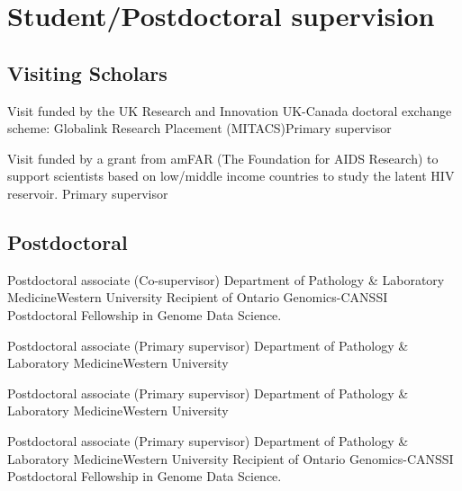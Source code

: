 
\section {Student/Postdoctoral supervision}

\subsection {Visiting Scholars}

{Visit funded by the UK Research and Innovation UK-Canada doctoral exchange scheme: Globalink Research Placement (MITACS)}{}{Primary supervisor}

{Visit funded by a grant from amFAR (The Foundation for AIDS Research) to support scientists based on low/middle income countries to study the latent HIV reservoir.}
{}{Primary supervisor}



\subsection {Postdoctoral}

{Postdoctoral associate (Co-supervisor)}
{Department of Pathology \& Laboratory Medicine}{Western University}
{Recipient of Ontario Genomics-CANSSI Postdoctoral Fellowship in Genome Data Science.}

{Postdoctoral associate (Primary supervisor)}
{Department of Pathology \& Laboratory Medicine}{Western University}
{}

{Postdoctoral associate (Primary supervisor)}
{Department of Pathology \& Laboratory Medicine}{Western University}
{}


{Postdoctoral associate (Primary supervisor)}
{Department of Pathology \& Laboratory Medicine}{Western University}
{Recipient of Ontario Genomics-CANSSI Postdoctoral Fellowship in Genome Data Science.}


